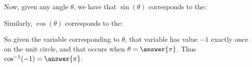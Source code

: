 \documentclass{ximera}
\begin{document}
\begin{question}
\begin{explanation}

Now, given any angle $\theta$, we have that $\sin(\theta)$ corresponds to the:

\begin{multipleChoice}
\end{multipleChoice}
Similarly, $\cos(\theta)$ corresponds to the:
\begin{multipleChoice}
\end{multipleChoice}

So given the variable corresponding to $\theta$, that variable has value $-1$ exactly once on the unit circle, and that occurs when $\theta=\answer{\pi}$.  Thus $\cos^{-1}(-1)=\answer{\pi}$.


\end{explanation}
\end{question}
\end{document}

